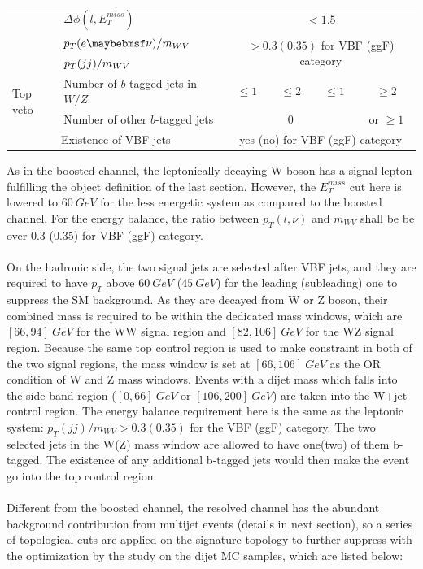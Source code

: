 \begin{table}[t]
\begin{center}
{\begin{tabular}{|l|l|c|c|c|c|}
				\cline{2-6}
				& $\Delta\phi(l,E^{miss}_{T})$ & \multicolumn{4}{c|}{ $<1.5$}\\
				\cline{2-6}
				& $\pt(e\nu) / m_{WV}$ &\multicolumn{4}{c|}{\multirow{2}{*}{$>0.3 (0.35)$ for VBF (ggF) category}}\\
				& $p_{T}(jj) / m_{WV}$ & \multicolumn{4}{c|}{ } \\
				\hline
				\multirow{2}{*}{Top veto} & Number of $b$-tagged jets in $W/Z$ & $\leq 1$ & $\leq 2$ & $\leq 1$ & $\geq2$ \\
				\cline{2-6}
				& Number of other $b$-tagged jets & \multicolumn{3}{c|}{0} & or $\geq 1$ \\
				\hline
				\multicolumn{2}{|c|}{Existence of VBF jets} & \multicolumn{4}{c|}{ yes (no) for VBF (ggF) category } \\
				\hline
			\end{tabular}
		}
	\end{center}
\end{table}
\noindent
As in the boosted channel, the leptonically decaying W boson has a signal lepton fulfilling the object definition of the last section. However, the $E_{T}^{miss}$ cut here is lowered to $60~GeV$ for the less energetic system as compared to the boosted channel. For the energy balance, the ratio between $p_{T}(l,\nu)$ and $m_{WV}$ shall be be over 0.3 (0.35) for VBF (ggF) category. 
\\
\\On the hadronic side, the two signal jets are selected after VBF jets, and they are required to have $p_{T}$ above $60~GeV$ ($45~GeV$) for the leading (subleading) one to suppress the SM background. As they are decayed from W or Z boson, their combined mass is required to be within the dedicated mass windows, which are $[66, 94]~GeV$ for the WW signal region and $[82, 106]~GeV$ for the WZ signal region. Because the same top control region is used to make constraint in both of the two signal regions, the mass window is set at $[66,106]~GeV$ as the OR condition of W and Z mass windows. Events with a dijet mass which falls into the side band region ($[0,66]~GeV$ or $[106,200]~GeV$) are taken into the W+jet control region. The energy balance requirement here is the same as the leptonic system: $p_{T}(jj)/m_{WV}>0.3(0.35)$ for the VBF (ggF) category. The two selected jets in the W(Z) mass window are allowed to have one(two) of them b-tagged. The existence of any additional b-tagged jets would then make the event go into the top control region.  
\\
\\Different from the boosted channel, the resolved channel has the abundant background contribution from multijet events (details in next section), so a series of topological cuts are applied on the signature topology to further suppress with the optimization by the study on the dijet MC samples, which are listed below:
